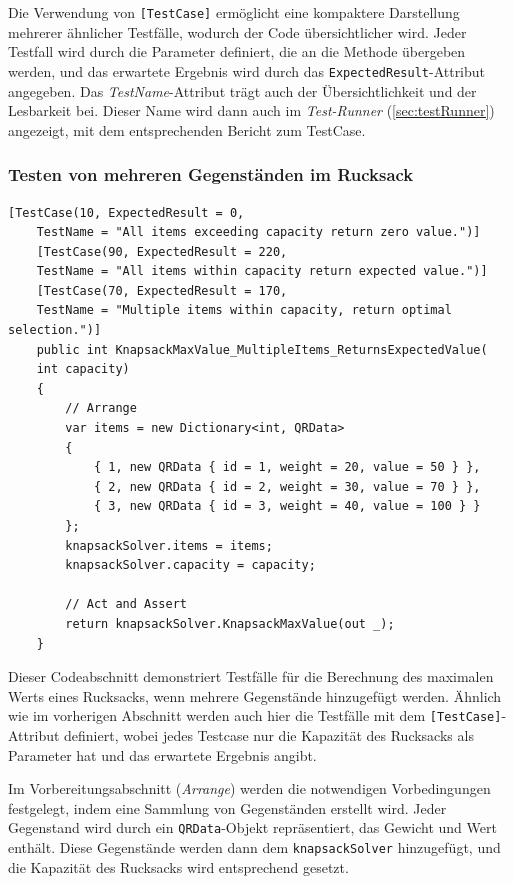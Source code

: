 \begin{itemize}
Die Verwendung von \texttt{[TestCase]} ermöglicht eine kompaktere Darstellung mehrerer ähnlicher Testfälle, wodurch der Code übersichtlicher wird. Jeder Testfall wird durch die Parameter definiert, die an die Methode übergeben werden, und das erwartete Ergebnis wird durch das \texttt{ExpectedResult}-Attribut angegeben. Das \textit{TestName}-Attribut trägt auch der Übersichtlichkeit und der Lesbarkeit bei. Dieser Name wird dann auch im \textit{Test-Runner} (\ref{sec:testRunner}) angezeigt, mit dem entsprechenden Bericht zum TestCase.

\subsubsection{Testen von mehreren Gegenständen im Rucksack}

\begin{lstlisting}[style=csharp, caption={Testfall: mehrere Gegenstände}, label={code:mehrTest}]
    [TestCase(10, ExpectedResult = 0,
    TestName = "All items exceeding capacity return zero value.")]
    [TestCase(90, ExpectedResult = 220,
    TestName = "All items within capacity return expected value.")]
    [TestCase(70, ExpectedResult = 170,
    TestName = "Multiple items within capacity, return optimal selection.")]
    public int KnapsackMaxValue_MultipleItems_ReturnsExpectedValue(
    int capacity)
    {
        // Arrange
        var items = new Dictionary<int, QRData>
        {
            { 1, new QRData { id = 1, weight = 20, value = 50 } },
            { 2, new QRData { id = 2, weight = 30, value = 70 } },
            { 3, new QRData { id = 3, weight = 40, value = 100 } }
        };
        knapsackSolver.items = items;
        knapsackSolver.capacity = capacity;

        // Act and Assert
        return knapsackSolver.KnapsackMaxValue(out _);
    }
\end{lstlisting}

Dieser Codeabschnitt demonstriert Testfälle für die Berechnung des maximalen Werts eines Rucksacks, wenn mehrere Gegenstände hinzugefügt werden. Ähnlich wie im vorherigen Abschnitt werden auch hier die Testfälle mit dem \texttt{[TestCase]}-Attribut definiert, wobei jedes Testcase nur die Kapazität des Rucksacks als Parameter hat und das erwartete Ergebnis angibt.

Im Vorbereitungsabschnitt (\textit{Arrange}) werden die notwendigen Vorbedingungen festgelegt, indem eine Sammlung von Gegenständen erstellt wird. Jeder Gegenstand wird durch ein \texttt{QRData}-Objekt repräsentiert, das Gewicht und Wert enthält. Diese Gegenstände werden dann dem \texttt{knapsackSolver} hinzugefügt, und die Kapazität des Rucksacks wird entsprechend gesetzt.


\end{itemize}
